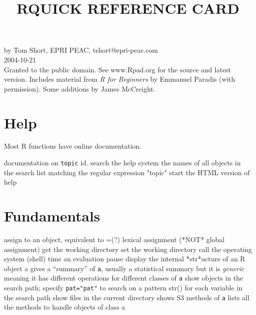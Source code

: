 

\def\content{R}
\def\versionnumber{0.1}  %
\def\year{2014}
\def\month{May}
\def\version{v\versionnumber\ \month\ \year}



\title{\content QUICK REFERENCE CARD}

\shortintro

by Tom Short, EPRI PEAC, tshort@epri-peac.com\\2004-10-21\\
Granted to the public domain. See www.Rpad.org for the source and latest version.
Includes material from {\it R for Beginners} by Emmanuel Paradis
(with permission). Some additions by James McCreight.

\section{Help}{Most R functions have online documentation.}

	{documentation on {\tt topic}}
	{id.}
	{search the help system}
	{the names of all objects in the search list
    matching the regular ex\-pres\-sion "to\-pic"}
	{start the HTML version of help}

\section{Fundamentals}{}
\cmdL{<-}	{assign to an object, equivalent to =(?)}
\cmdL{<<-}	{lexical assignment (*NOT* global assignment)}
	{get the working directory}
	{set the working directory}
	{call the operating system (shell)}
	{time an evaluation}
	{pause}
	{display the internal *str*ucture of an R object a}
	{gives a ``summary'' of {\tt a}, usually a statistical summary but it is {\it generic} meaning it has different operations for different classes of {\tt a}}
	{show objects in the search path; specify {\tt pat="pat"} to search on a pattern}
	{str() for each variable in the search path}
	{show files in the current directory}
	{shows S3 methods of {\tt a}}
	{lists all the methods to handle objects of class a}

